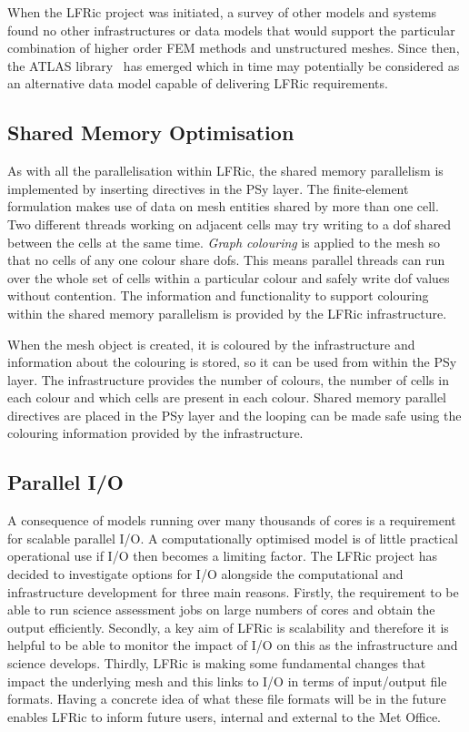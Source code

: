 \documentclass[review,times]{elsarticle}
\begin{document}
When the LFRic project was initiated, a survey of other models and
systems found no other infrastructures or data models that would
support the particular combination of higher order FEM methods and
unstructured meshes. Since then, the ATLAS
library~\cite{DECONINCK2017188} has emerged which in time may
potentially be considered as an alternative data model capable of
delivering LFRic requirements.

\subsection{\label{sec:sub:sharedmem}Shared Memory Optimisation}

As with all the parallelisation within LFRic, the shared memory
parallelism is implemented by inserting directives in the PSy layer. 
The finite-element formulation makes use of data on mesh entities
shared by more than one cell. Two different threads working on
adjacent cells may try writing to a dof shared between the cells at the
same time.
{\em Graph colouring} is applied to the mesh so that no cells of any one
colour share dofs. This means parallel threads can run over the whole
set of cells within a particular colour and safely write dof values
without contention.
The information and functionality to support
colouring within the shared memory parallelism is provided by the LFRic
infrastructure.

When the mesh object is created, it is coloured by the infrastructure
and information about the colouring is stored, so it can be used from
within the PSy layer. The infrastructure provides the number of colours,
the number of cells in each colour and which cells are present in each
colour. Shared memory parallel directives are placed in the PSy layer
and the looping can be made safe using the colouring information
provided by the infrastructure. 

\subsection{\label{sec:sub:io}Parallel I/O}

A consequence of models running over many thousands of cores is a requirement
for scalable parallel I/O. A computationally optimised model is of little practical
operational use if I/O then becomes a limiting factor. The LFRic project has
decided to investigate options for I/O alongside the computational
and infrastructure development for three main reasons. Firstly, the requirement
to be able to run science assessment jobs on large numbers of cores and obtain the
output efficiently. Secondly, a key aim of LFRic is scalability and therefore it is
helpful to be able to monitor the impact of I/O on this as the infrastructure and
science develops. Thirdly, LFRic is making some fundamental changes that impact the
underlying mesh and this links to I/O in terms of input/output file formats. Having
a concrete idea of what these file formats will be in the future enables LFRic to
inform future users, internal and external to the Met Office.
\end{document}
